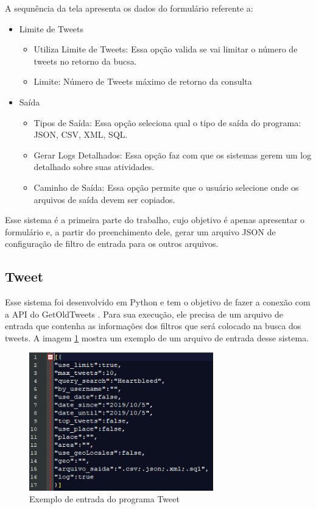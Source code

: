 A sequnência da tela apresenta os dados do formulário referente a:

\begin{itemize}

\item Limite de Tweets

\begin{itemize}
\item Utiliza Limite de Tweets: Essa opção valida se vai limitar o número de tweets no retorno da bucsa.
\item Limite: Número de Tweets máximo de retorno da consulta
\end{itemize}

\item Saída

\begin{itemize}
\item Tipos de Saída: Essa opção seleciona qual o tipo de saída do programa: JSON, CSV, XML, SQL.
\item Gerar Logs Detalhados: Essa opção faz com que os sistemas gerem um log detalhado sobre suas atividades.
\item Caminho de Saída: Essa opção permite que o usuário selecione onde os arquivos de saída devem ser copiados.
\end{itemize}

\end{itemize}

Esse sistema é a primeira parte do trabalho, cujo objetivo é apenas apresentar o formulário e, a partir do preenchimento dele, gerar um arquivo JSON de configuração de filtro de entrada para os outros arquivos.
 
\subsection{Tweet}

Esse sistema foi desenvolvido em Python e tem o objetivo de fazer a conexão com a API do GetOldTweets \cite{Pythoncommunity}. Para sua execução, ele precisa de um arquivo de entrada que contenha as informações dos filtros que será colocado na busca dos tweets. A imagem \ref{fig:entradaTweet} mostra um exemplo de um arquivo de entrada desse sistema.

\begin{figure}[H]
\centering
\includegraphics[width=8cm]{imagens/entradaTweet.png}
\caption{Exemplo de entrada do programa Tweet}
\label{fig:entradaTweet}
\end{figure}

